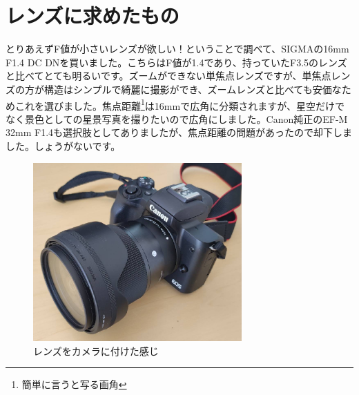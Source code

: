 \documentclass[a4paper.10pt]{jarticle}
\begin{document}
\section{レンズに求めたもの}
とりあえずF値が小さいレンズが欲しい！ということで調べて、SIGMAの16mm F1.4 DC DNを買いました。こちらはF値が1.4であり、持っていたF3.5のレンズと比べてとても明るいです。ズームができない単焦点レンズですが、単焦点レンズの方が構造はシンプルで綺麗に撮影ができ、ズームレンズと比べても安価なためこれを選びました。焦点距離\footnote{簡単に言うと写る画角}は16mmで広角に分類されますが、星空だけでなく景色としての星景写真を撮りたいので広角にしました。Canon純正のEF-M 32mm F1.4も選択肢としてありましたが、焦点距離の問題があったので却下しました。しょうがないです。
\begin{figure}
	\begin{center}
		\includegraphics[width=8cm]{don.jpg}
		\caption{レンズをカメラに付けた感じ}
		\label{}
	\end{center}
\end{figure}
\end{document}
